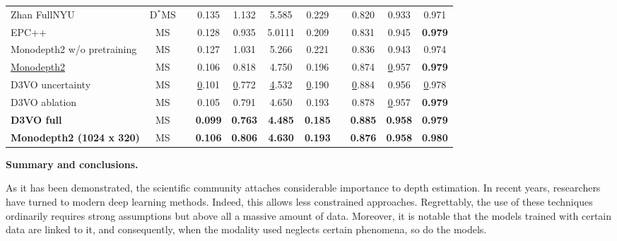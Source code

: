 \begin{table}[h]
{\begin{tabular}{lcccccccccc}
			Zhan FullNYU \cite{zhan2018unsupervised}              & D$^*$MS &  & 0.135       & 1.132       & 5.585  & 0.229    &  & 0.820 & 0.933       & 0.971          \\
			EPC++ \cite{luo2019every}                     & MS      &  & 0.128       & 0.935       & 5.0111 & 0.209    &  & 0.831 & 0.945       & \textbf{0.979} \\
			Monodepth2 w/o pretraining \cite{godard2019digging} & MS      &  & 0.127       & 1.031       & 5.266  & 0.221    &  & 0.836 & 0.943       & 0.974          \\
			\underline{Monodepth2} \cite{godard2019digging}                & MS      &  & 0.106       & 0.818       & 4.750  & 0.196    &  & 0.874 & {\ul 0.957} & \textbf{0.979} \\
			D3VO uncertainty \cite{yang2020d3vo} &
			MS &
			&
			{\ul 0.101} &
			{\ul 0.772} &
			{\ul 4.532} &
			{\ul 0.190} &
			&
			{\ul 0.884} &
			0.956 &
			{\ul 0.978} \\
			D3VO ablation \cite{yang2020d3vo}             & MS      &  & 0.105       & 0.791       & 4.650  & 0.193    &  & 0.878 & {\ul 0.957} & \textbf{0.979} \\
			\textbf{D3VO full} \cite{yang2020d3vo} &
			MS &
			&
			\textbf{0.099} &
			\textbf{0.763} &
			\textbf{4.485} &
			\textbf{0.185} &
			&
			\textbf{0.885} &
			\textbf{0.958} &
			\textbf{0.979} \\ \hline
			\textbf{Monodepth2 (1024 x 320)} \cite{godard2019digging} &
			MS &
			&
			\textbf{0.106} &
			\textbf{0.806} &
			\textbf{4.630} &
			\textbf{0.193} &
			\textbf{} &
			\textbf{0.876} &
			\textbf{0.958} &
			\textbf{0.980}
		\end{tabular}%
	}
\end{table}

\textbf{Summary and conclusions. } 

As it has been demonstrated, the scientific community attaches considerable importance to depth estimation. In recent years, researchers have turned to modern deep learning methods. Indeed, this allows less constrained approaches. Regrettably, the use of these techniques ordinarily requires strong assumptions but above all a massive amount of data. Moreover, it is notable that the models trained with certain data are linked to it, and consequently, when the modality used neglects certain phenomena, so do the models. 



